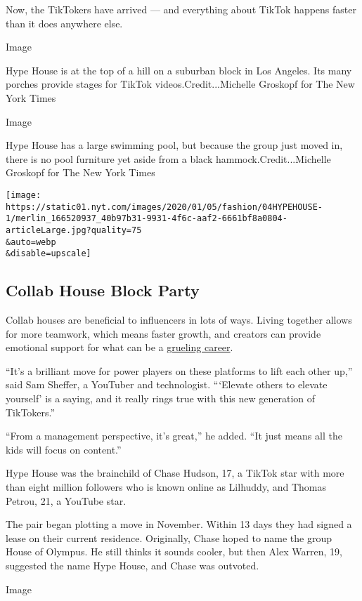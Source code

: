 Now, the TikTokers have arrived --- and everything about TikTok happens
faster than it does anywhere else.

Image

Hype House is at the top of a hill on a suburban block in Los Angeles.
Its many porches provide stages for TikTok videos.Credit...Michelle
Groskopf for The New York Times

Image

Hype House has a large swimming pool, but because the group just moved
in, there is no pool furniture yet aside from a black
hammock.Credit...Michelle Groskopf for The New York Times

\texttt{[image: https://static01.nyt.com/images/2020/01/05/fashion/04HYPEHOUSE-1/merlin\_166520937\_40b97b31-9931-4f6c-aaf2-6661bf8a0804-articleLarge.jpg?quality=75\\\&auto=webp\\\&disable=upscale]}

\hypertarget{collab-house-block-party}{%
\subsection{Collab House Block Party}\label{collab-house-block-party}}

Collab houses are beneficial to influencers in lots of ways. Living
together allows for more teamwork, which means faster growth, and
creators can provide emotional support for what can be a
\href{https://www.tubefilter.com/2019/05/31/burnout-influencers-social-media-solutions-treatment-who/}{grueling
career}.

``It's a brilliant move for power players on these platforms to lift
each other up,'' said Sam Sheffer, a YouTuber and technologist.
```Elevate others to elevate yourself' is a saying, and it really rings
true with this new generation of TikTokers.''

``From a management perspective, it's great,'' he added. ``It just means
all the kids will focus on content.''

Hype House was the brainchild of Chase Hudson, 17, a TikTok star with
more than eight million followers who is known online as Lilhuddy, and
Thomas Petrou, 21, a YouTube star.

The pair began plotting a move in November. Within 13 days they had
signed a lease on their current residence. Originally, Chase hoped to
name the group House of Olympus. He still thinks it sounds cooler, but
then Alex Warren, 19, suggested the name Hype House, and Chase was
outvoted.

Image

